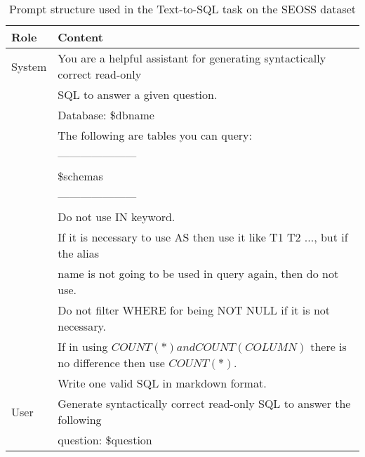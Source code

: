 \begin{table}[h]
    \centering
    \begin{tabular}{|l|l|}
        \hline
        \textbf{Role} & \textbf{Content}                                                                             \\ \hline
        System        & You are a helpful assistant for generating syntactically correct read-only                   \\
                      & SQL to answer a given question.                                                              \\
                      & Database: \$dbname                                                                           \\
                      & The following are tables you can query:                                                      \\
                      & ---------------------                                                                        \\
                      & \$schemas                                                                                    \\
                      & ---------------------                                                                        \\
                      & Do not use IN keyword.                                                                       \\
                      & If it is necessary to use AS then use it like T1 T2 ..., but if the alias                    \\
                      & name is not going to be used in query again, then do not use.                                \\
                      & Do not filter WHERE for being NOT NULL if it is not necessary.                               \\
                      & \small{If in using $COUNT(*) and COUNT(COLUMN)$ there is no difference then use $COUNT(*)$.} \\
                      & Write one valid SQL in markdown format.                                                      \\ \hline
        User          & Generate syntactically correct read-only SQL to answer the following                         \\
                      & question: \$question                                                                         \\ \hline
    \end{tabular}
    \caption{Prompt structure used in the Text-to-SQL task on the SEOSS dataset}
\end{table}

